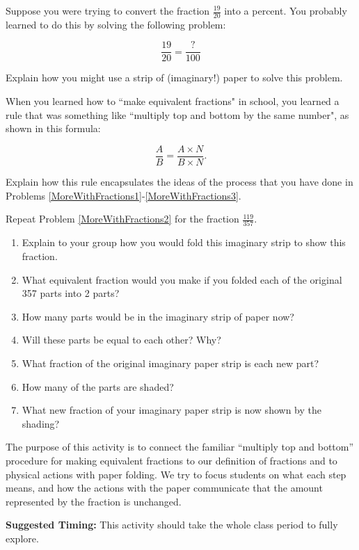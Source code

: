 \documentclass{ximera}
\begin{document}
\newpage

\begin{problem}\label{MoreWithFractions3}
Suppose you were trying to convert the fraction $\frac{19}{20}$ into a percent.  You probably learned to do this by solving the following problem:

\[ \frac{19}{20} = \frac{?}{100} \]

Explain how you might use a strip of (imaginary!) paper  to solve this problem.
\end{problem}




\begin{problem}
When you learned how to ``make equivalent fractions" in school, you learned a rule that was something like ``multiply top and bottom by the same number", as shown in this formula:

  \[ \frac{A}{B} = \frac{A \times N}{B \times N}. \]

Explain how this rule encapsulates the ideas of the process that you have done in Problems \ref{MoreWithFractions1}-\ref{MoreWithFractions3}.
\end{problem}





\begin{problem}
 Repeat Problem \ref{MoreWithFractions2} for the fraction $\frac{119}{357}$. 
\begin{enumerate}
    \item Explain to your group how you would fold this imaginary strip to show this fraction.    
    \item What equivalent fraction would you make if you folded each of the original 357 parts into 2 parts?
   \item   How many parts would be in the imaginary strip of paper now?
    \item  Will these parts be equal to each other?  Why?
    \item   What fraction of the original imaginary paper strip is each new part?
    \item   How many of the parts are shaded?
    \item   What new fraction of your imaginary paper strip is now shown by the shading?  
\end{enumerate}
\end{problem}


\newpage

\begin{instructorNotes}
The purpose of this activity is to connect the familiar ``multiply top and bottom'' procedure for making equivalent fractions to our definition of fractions and to physical actions with paper folding.  We try to focus students on what each step means, and how the actions with the paper communicate that the amount represented by the fraction is unchanged.




{\bf Suggested Timing:} This activity should take the whole class period to fully explore.
\end{instructorNotes}
\end{document}

